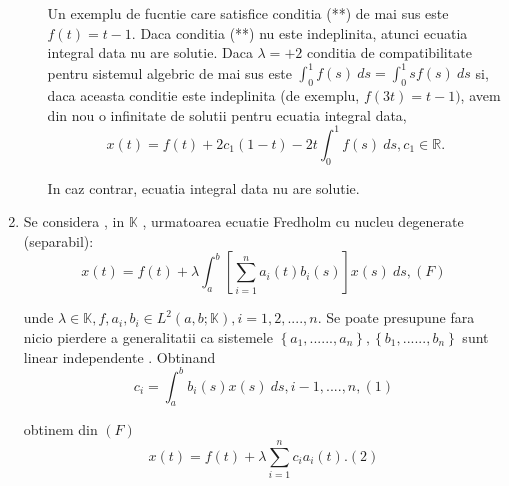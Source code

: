 \documentclass[a4paper,12pt,oneside]{report}
\begin{document}
\begin{enumerate}
\begin{enumerate}[label=(\alph*)]
		      		      Un exemplu de fucntie care satisfice conditia (**) de mai sus este \(f\left ( t  \right ) = t-1.\)
		      		      Daca conditia (**) nu este indeplinita, atunci ecuatia integral data nu are solutie. 
		      		      Daca \(\lambda = +2\) conditia de compatibilitate pentru sistemul algebric de mai sus este 
		      		      \(\int_{0}^{1}f\left ( s \right ) \ ds = \int_{0}^{1}sf\left ( s \right ) \ ds\)
		      		      si, daca aceasta conditie este indeplinita (de exemplu,  \(f\left ( 3t  \right ) = t-1)\), avem din nou o infinitate de solutii pentru ecuatia integral data, 
		      		      \begin{displaymath}
		      		      	x\left ( t \right ) = f\left ( t \right ) + 2c_{1}\left ( 1-t \right ) -2t\int_{0}^{1}f\left ( s \right ) \ ds, c_{1} \in \mathbb{R}. 
		      		      \end{displaymath}
		      		      		      		      		      		      
		      		      In caz contrar, ecuatia integral data nu are solutie. 
		      		      		      		      		      		      		      		      
		      	\end{enumerate}     	
		      			      			      			      	
		      	\item Se considera , in \(\mathbb{K}\) , urmatoarea ecuatie Fredholm cu nucleu degenerate (separabil):
		      	\begin{displaymath}
		      		x\left (  t\right ) = f\left ( t \right ) + \lambda \int_{a}^{b} \left [ \sum_{i = 1}^{n}a_{i}\left ( t \right )b_{i}\left ( s \right ) \right ]x\left ( s \right ) \ ds , ( F)
		      	\end{displaymath}
		      			      			      	
		      	unde \(\lambda \in \mathbb{K} , f, a_{i}, b_{i} \in L^{2} \left ( a,b ; \mathbb{K} \right ), i = 1,2,....,n.\) Se poate presupune fara nicio pierdere a generalitatii ca sistemele \(\left \{ a_{1},......,a_{n} \right \}, \left \{ b_{1},......,b_{n} \right \}\) sunt linear independente . Obtinand 
		      	\begin{displaymath}
		      		c_{i} = \int_{a}^{b} b_{i}\left ( s \right )x\left ( s \right )\ ds, i - 1,....,n, (1)
		      	\end{displaymath}
		      			      			      	
		      	obtinem din \((F) \)
		      	\begin{displaymath}
		      		x\left ( t \right ) = f\left ( t \right ) + \lambda \sum_{i=1}^{n}c_{i}a_{i}\left ( t \right ). (2)
		      	\end{displaymath}
		      			      			      	

\end{enumerate}
\end{document}
